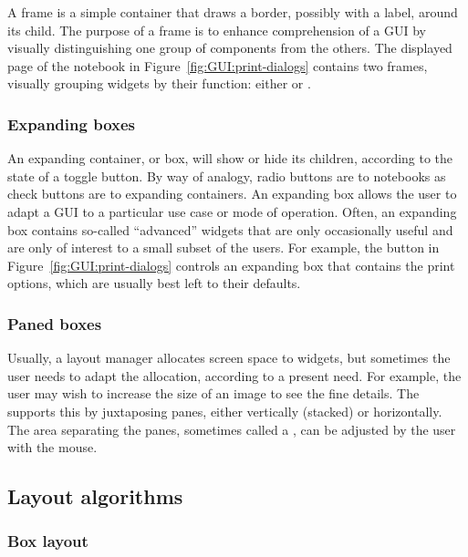 A frame is a simple container that draws a border, possibly with a
label, around its child. The purpose of a frame is to enhance
comprehension of a GUI by visually distinguishing one group of
components from the others. The displayed page of the notebook in
Figure~\ref{fig:GUI:print-dialogs} contains two frames, visually
grouping widgets by their function: either 
or .

\subsubsection{Expanding boxes}
\label{sec:GUI:expanding-boxes}

An expanding container, or box, will show or hide its children, according to the
state of a toggle button. By way of analogy, radio buttons are to
notebooks as check buttons are to expanding containers. An expanding box
allows the user to adapt a GUI to a particular use case or mode of
operation. Often, an expanding box contains so-called ``advanced''
widgets that are only occasionally useful and are only of interest to
a small subset of the users. For example, the  button in
Figure~\ref{fig:GUI:print-dialogs} controls an expanding box that
contains the print options, which are usually best left to their
defaults.

\subsubsection{Paned boxes}
\label{sec:GUI:paned-boxes}

Usually, a layout manager allocates screen space to widgets, but
sometimes the user needs to adapt the allocation, according to a
present need. For example, the user may wish to increase the size of
an image to see the fine details. The 
supports this by juxtaposing panes, either vertically (stacked) or
horizontally. The area separating the panes, sometimes called a
, can be adjusted by the user with the mouse.
   
\subsection{Layout algorithms}
\label{sec:GUI:layout}

\subsubsection{Box layout}
\label{sec:GUI:Box-containers}

